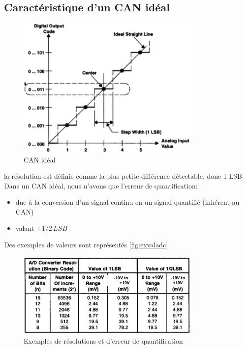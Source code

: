\subsection{Caractéristique d'un CAN idéal}
\begin{figure}[H] 
	\centering 
	\includegraphics[width=0.8\textwidth,height=10\baselineskip,keepaspectratio]{ch5/image3} 
	\caption{CAN idéal} 
\end{figure}
la résolution est définie comme la plus petite différence détectable, donc 1 LSB\\
Dans un CAN idéal, nous n'avons que l'erreur de quantification:
\begin{itemize}
	\item due à la conversion d'un signal continu en un signal quantifié (inhérent au CAN)
	\item valant \(\pm 1/2\,LSB\)
\end{itemize}
Des exemples de valeurs sont représentés \autoref{fig:exvaladc}
\begin{figure}[H] 
	\centering 
	\includegraphics[width=0.8\textwidth,height=10\baselineskip,keepaspectratio]{ch5/image4} 
	\caption{Exemples de résolutions et d'erreur de quantification}
	\label{fig:exvaladc} 
\end{figure}
